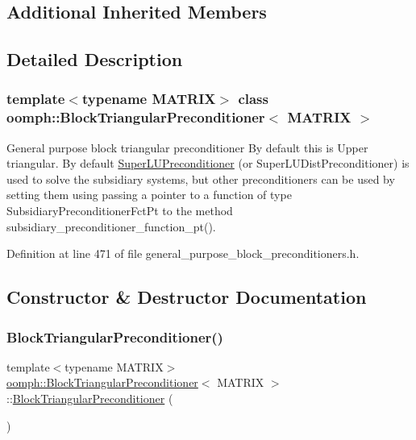 \subsection*{Additional Inherited Members}


\subsection{Detailed Description}
\subsubsection*{template$<$typename M\+A\+T\+R\+IX$>$\newline
class oomph\+::\+Block\+Triangular\+Preconditioner$<$ M\+A\+T\+R\+I\+X $>$}

General purpose block triangular preconditioner By default this is Upper triangular. By default \hyperlink{classoomph_1_1SuperLUPreconditioner}{Super\+L\+U\+Preconditioner} (or Super\+L\+U\+Dist\+Preconditioner) is used to solve the subsidiary systems, but other preconditioners can be used by setting them using passing a pointer to a function of type Subsidiary\+Preconditioner\+Fct\+Pt to the method subsidiary\+\_\+preconditioner\+\_\+function\+\_\+pt(). 

Definition at line 471 of file general\+\_\+purpose\+\_\+block\+\_\+preconditioners.\+h.



\subsection{Constructor \& Destructor Documentation}
\mbox{\label{classoomph_1_1BlockTriangularPreconditioner_a79e23b3f3765ee0b8bc0f8f98f531277}} 
\subsubsection{\texorpdfstring{Block\+Triangular\+Preconditioner()}{BlockTriangularPreconditioner()}\hspace{0.1cm}{\footnotesize\ttfamily [1/2]}}
{\footnotesize\ttfamily template$<$typename M\+A\+T\+R\+IX$>$ \\
\hyperlink{classoomph_1_1BlockTriangularPreconditioner}{oomph\+::\+Block\+Triangular\+Preconditioner}$<$ M\+A\+T\+R\+IX $>$\+::\hyperlink{classoomph_1_1BlockTriangularPreconditioner}{Block\+Triangular\+Preconditioner} (\begin{DoxyParamCaption}{ }\end{DoxyParamCaption})\hspace{0.3cm}{\ttfamily [inline]}}




